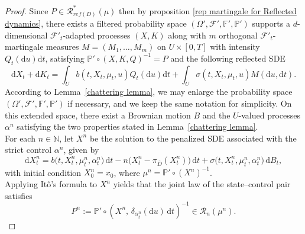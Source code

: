 \documentclass[11pt,amsfonts]{article}
\theoremstyle{plain}
\theoremstyle{assumpstyle}
\numberwithin{equation}{section}
\numberwithin{theorem}{section}
\numberwithin{proposition}{section}
\numberwithin{definition}{section}
\numberwithin{remark}{section}
\numberwithin{corollary}{section}
\numberwithin{lemma}{section}
\begin{document}
\begin{proof}
Since $P \in \mathcal{R}^*_{ref(D)}(\mu)$ then by proposition \ref{rep martingale for Reflected dynamics}, there exists a filtered probability space $(\Omega', \mathcal{F}', \mathbb{F}', \mathbb{P}')$ supports a $d$-dimensional $ \mathcal{F}'_t$-adapted processes $(X, K)$ along with $ m $ orthogonal $\mathcal{F}'_t $-martingale measures $M= (M_1, \dots, M_m)$
on $U \times [0,T] $ with intensity $ Q_t(\mathrm{d}u)\mathrm{d}t $, satisfying $\mathbb{P}' \circ (X, K, Q)^{-1} = P$ and the following reflected SDE
\begin{equation*}
\mathrm{d}X_t+ \mathrm{d}K_t = \displaystyle\int_{U}^{} b(t,X_t,\mu_t, u)Q_t(\mathrm{d}u)\mathrm{d}t +\int_{U}^{}\sigma(t,X_t,\mu_t, u) M(\mathrm{d}u,\mathrm{d}t) .
\end{equation*}
According to Lemma~\ref{chattering lemma}, we may enlarge the probability space 
$(\Omega', \mathcal{F}', \mathbb{F}', \mathbb{P}')$ if necessary, and we keep the same notation for simplicity. 
On this extended space, there exist a Brownian motion $B$ and the 
$U$-valued processes $\alpha^n$ satisfying the two properties stated in 
Lemma~\ref{chattering lemma}.\\
For each $n \in \mathbb{N}$, let $X^{n}$ be the solution to the penalized SDE associated with the strict control $\alpha^{n}$, given by
\begin{equation*}
\mathrm{d}X^{n}_{t}
= b\big(t, X^{n}_{t}, \mu^{n}_{t}, \alpha^{n}_{t}\big)\, \mathrm{d}t
- n\big(X^{n}_{t} - \pi_{\bar{D}}(X^{n}_{t})\big)\, \mathrm{d}t
+ \sigma\big(t, X^{n}_{t}, \mu^{n}_{t}, \alpha^{n}_{t}\big)\, \mathrm{d}B_{t},
\end{equation*}
with initial condition $X^n_0 = x_0$, where $\mu^{n} = \mathbb{P}' \circ (X^{n})^{-1}$.\\
Applying Itô’s formula to $ X^{n}$ yields that the joint law of the state–control pair satisfies
\begin{equation*}
P^{n} := \mathbb{P}' \circ \left(X^{n},\, \delta_{\alpha^{n}_{t}}(\mathrm{d}u)\, \mathrm{d}t\right)^{-1}
\in \mathcal{R}_{n}(\mu^{n}).
\end{equation*}


\end{proof}
\end{document}
